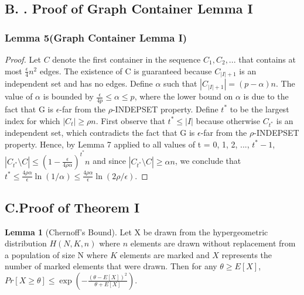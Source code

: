 \documentclass[preprint,11pt]{elsarticle}
\theoremstyle{definition}
\newtheorem{lemma}[theorem]{Lemma}
\begin{document}
\begin{multicols}{2}
\subsection*{B. . Proof of Graph Container Lemma I}
\subsubsection*{\textbf{Lemma 5}(Graph Container Lemma I)}
\begin{proof}
 Let $C$ denote the first container in the sequence $C_1, C_2, ...$ that contains at most $\frac{\epsilon}{4}n^2$ edges. The existence of C is guaranteed because $C_{|I|+1}$ is an independent set and has no edges. Define $\alpha$ such that $|C_{|I|+1}| = (p-\alpha)n$. The value of $\alpha$ is bounded by $\frac{\epsilon}{4p} \leq \alpha \leq p$, where the lower bound on $\alpha$ is due to the fact that G is $\epsilon$-far from the $\rho$-INDEPSET property.
Define $t^*$ to be the largest index for which $|C_t| \geq \rho n$. First observe that $t^* \leq |I|$ because otherwise $C_{t^*}$ is an independent set, which contradicts the fact that G is $\epsilon$-far from the $\rho$-INDEPSET property. Hence, by Lemma 7 applied to all values of t = 0, 1, 2, ..., $t^* - 1$,
$|C_{t^*} \setminus C| \leq (1 - \frac{\epsilon}{4\rho \alpha})^{t^*} n$
and since $|C_{t^*} \setminus C| \geq \alpha n$, we conclude that $t^* \leq \frac{4\rho \alpha}{\epsilon} \ln(1/\alpha) \leq \frac{4\rho \alpha}{\epsilon} \ln(2\rho/\epsilon)$.
\end{proof}
\subsection*{C.Proof of Theorem I}
\begin{lemma}[Chernoff’s Bound]
Let X be drawn from the
hypergeometric distribution $H(N, K, n)$ where $n$ elements are
drawn without replacement from a population of size N where
$K$ elements are marked and $X$ represents the number of
marked elements that were drawn. Then for any $\theta \geq E[X]$,
$Pr[X \geq \theta] \leq \exp \left( -\frac{(\theta - E[X])^2}{\theta + E[X]} \right)$.  
\end{lemma}

\end{multicols}
\end{document}
